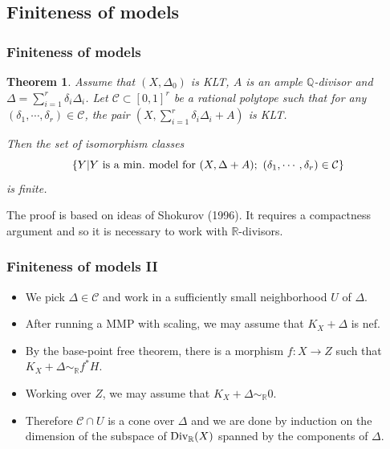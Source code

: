 \documentclass{beamer}
\theoremstyle{plain}
\newtheorem*{thm}{Theorem}
\theoremstyle{definition}
\theoremstyle{remark}
\begin{document}
\subsection{Finiteness of models}
\begin{frame}
\frametitle{Finiteness of models}
\begin{thm} Assume that $(X,\Delta _0)$ is KLT, $A$ is an ample $\mathbb {Q}$-divisor and $\Delta =\sum _{i=1}^r
\delta _i \Delta _i$. Let
$\mathcal{C}\subset [0,1]^r$ be a rational polytope such that
for any $(\delta _1,\cdots ,\delta _r)\in \mathcal{C}$, the pair
$(X,\sum _{i=1}^r
\delta _i \Delta _i+A)$ is KLT. 

Then the set of isomorphism classes $$\{Y|Y\ {\rm is\ a\ min.\ model\
for \ }(X,\Delta +A);\ 
(\delta _1,\cdots ,\delta _r)\in \mathcal{C}\}$$
is finite.\end{thm}
The proof is based on ideas of Shokurov (1996). It requires a compactness argument
and so it is necessary to work with $\mathbb{R}$-divisors.
\end{frame}
\begin{frame}
\frametitle{Finiteness of models II}
\begin{itemize} 
\item We pick $\Delta \in \mathcal{C}$ and work in a sufficiently small neighborhood $U$ of $\Delta$.
\item After running a MMP with scaling, we may assume that $K_X+\Delta$ is nef.\item By the base-point free theorem, there is a morphism 
$f:X\to Z$ such that $K_X+\Delta \sim _{\mathbb R}f^*H$.
\item Working over $Z$, we may assume that $K_X+\Delta \sim _{\mathbb R} 0$.
\item Therefore $\mathcal{C}\cap U$ is a cone over $\Delta$ and we are 
done by induction on the dimension of the subspace of ${\rm Div }_{\mathbb {R}}(X)$ spanned by the components of $\Delta$.
\end{itemize}

\end{frame}
\end{document}

